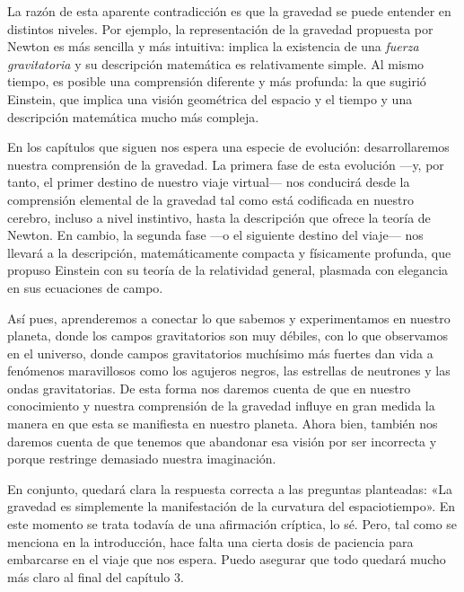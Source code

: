 La razón de esta aparente contradicción es que la gravedad se puede entender en
distintos niveles. Por ejemplo, la representación de la gravedad propuesta por
Newton es más sencilla y más intuitiva: implica la existencia
de una \emph{fuerza gravitatoria} y su
descripción matemática es relativamente simple. Al mismo tiempo, es posible una
comprensión diferente y más profunda: la que sugirió Einstein, que implica una
visión geométrica del espacio y el tiempo y una descripción matemática mucho
más compleja.

En los capítulos que siguen nos espera una especie de evolución: desarrollaremos
nuestra comprensión de la gravedad. La primera fase de esta evolución ---y, por
tanto, el primer destino de nuestro viaje virtual--- nos conducirá desde la
comprensión elemental de la gravedad tal como está codificada en nuestro cerebro,
incluso a nivel instintivo, hasta la descripción que ofrece la teoría de
Newton. En cambio, la segunda fase ---o el siguiente destino
del viaje--- nos llevará a la descripción, matemáticamente compacta y físicamente
profunda, que propuso Einstein con su teoría de la relatividad
general,
plasmada con elegancia en sus ecuaciones de campo.

Así pues, aprenderemos a conectar lo que sabemos y experimentamos en nuestro planeta,
donde los campos gravitatorios son muy débiles, con lo que observamos en el universo,
donde campos gravitatorios muchísimo más fuertes dan vida a fenómenos maravillosos
como los agujeros negros, las estrellas de neutrones y las ondas
gravitatorias.
De esta forma nos daremos cuenta de que en nuestro conocimiento y nuestra comprensión
de la gravedad influye en gran medida la manera en que esta se manifiesta en nuestro
planeta. Ahora bien, también nos daremos cuenta de que tenemos que abandonar esa
visión por ser incorrecta y porque restringe demasiado nuestra imaginación.

En conjunto, quedará clara la respuesta correcta a las preguntas planteadas:
«La gravedad es simplemente la manifestación de la curvatura del espaciotiempo».
En este momento se trata todavía de una afirmación críptica, lo sé. Pero, tal como
se menciona en la introducción, hace falta una cierta dosis de paciencia para
embarcarse en el viaje que nos espera. Puedo asegurar que todo quedará mucho más
claro al final del capítulo 3.
